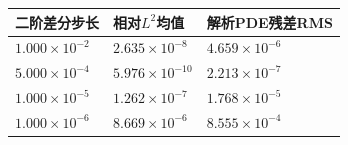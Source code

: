 \begin{tabular}{lll}\toprule
二阶差分步长 & 相对$L^2$均值 & 解析PDE残差RMS \\ \midrule
$1.000\times10^{-2}$ & $2.635\times10^{-8}$ & $4.659\times10^{-6}$ \\
$5.000\times10^{-4}$ & $5.976\times10^{-10}$ & $2.213\times10^{-7}$ \\
$1.000\times10^{-5}$ & $1.262\times10^{-7}$ & $1.768\times10^{-5}$ \\
$1.000\times10^{-6}$ & $8.669\times10^{-6}$ & $8.555\times10^{-4}$ \\
\bottomrule\end{tabular}
